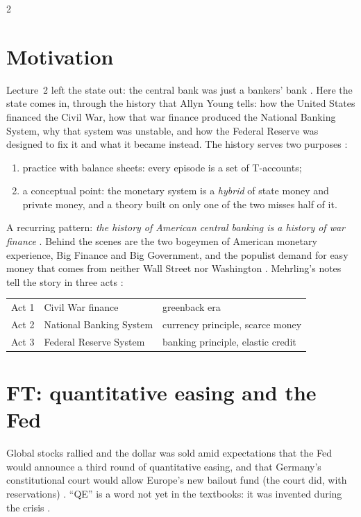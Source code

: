\begin{paracol}{2}
\section*{Motivation}
Lecture~2 left the state out: the central bank was just a bankers' bank . Here the state comes in, through
the history that Allyn Young tells: how the United States financed the Civil War, how that war finance produced the
National Banking System, why that system was unstable, and how the Federal Reserve was designed to fix it and what it became
instead. The history serves two purposes :
\begin{enumerate}
  \item practice with balance sheets: every episode is a set of T-accounts;
  \item a conceptual point: the monetary system is a \emph{hybrid} of state money and private money, and a theory built on only
        one of the two misses half of it.
\end{enumerate}
A recurring pattern: \emph{the history of American central banking is a history of war finance} . Behind the scenes are the
two bogeymen of American monetary experience, Big Finance and Big Government, and the populist demand for easy money that comes from neither Wall
Street nor Washington . Mehrling's notes tell the story in three acts :
\begin{center}
\renewcommand{\arraystretch}{1.35}
\begin{tabular}{lll}
\toprule
Act 1 & Civil War finance & greenback era\\
Act 2 & National Banking System & currency principle, scarce money\\
Act 3 & Federal Reserve System & banking principle, elastic credit\\
\bottomrule
\end{tabular}
\end{center}

\section{FT: quantitative easing and the Fed}\label{sec:st-ft}

\begin{casestudy}
Global stocks rallied and the dollar was sold amid expectations that the Fed would announce a third round of quantitative
easing, and that Germany's constitutional court would allow Europe's new bailout fund (the court did, with reservations)
. ``QE'' is a word not yet in the textbooks: it was invented during the crisis
.


\end{casestudy}
\end{paracol}
